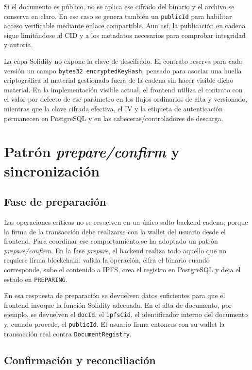 \documentclass[11pt, a4paper]{article}
\begin{document}
Si el documento es público, no se aplica ese cifrado del binario y el archivo se conserva en claro. En ese caso se genera también un \texttt{publicId} para habilitar acceso verificable mediante enlace compartible. Aun así, la publicación en cadena sigue limitándose al CID y a los metadatos necesarios para comprobar integridad y autoría.

La capa Solidity no expone la clave de descifrado. El contrato reserva para cada versión un campo \texttt{bytes32 encryptedKeyHash}, pensado para asociar una huella criptográfica al material gestionado fuera de la cadena sin hacer visible dicho material. En la implementación visible actual, el frontend utiliza el contrato con el valor por defecto de ese parámetro en los flujos ordinarios de alta y versionado, mientras que la clave cifrada efectiva, el IV y la etiqueta de autenticación permanecen en PostgreSQL y en las cabeceras/controladores de descarga.

\section{Patrón \textit{prepare/confirm} y sincronización}

\subsection{Fase de preparación}

Las operaciones críticas no se resuelven en un único salto backend-cadena, porque la firma de la transacción debe realizarse con la wallet del usuario desde el frontend. Para coordinar ese comportamiento se ha adoptado un patrón \textit{prepare/confirm}. En la fase \textit{prepare}, el backend realiza todo aquello que no requiere firma blockchain: valida la operación, cifra el binario cuando corresponde, sube el contenido a IPFS, crea el registro en PostgreSQL y deja el estado en \texttt{PREPARING}.

En esa respuesta de preparación se devuelven datos suficientes para que el frontend invoque la función Solidity adecuada. En el alta de documento, por ejemplo, se devuelven el \texttt{docId}, el \texttt{ipfsCid}, el identificador interno del documento y, cuando procede, el \texttt{publicId}. El usuario firma entonces con su wallet la transacción real contra \texttt{DocumentRegistry}.

\subsection{Confirmación y reconciliación}
\end{document}
